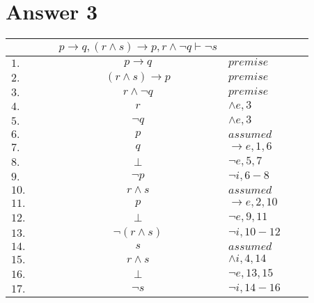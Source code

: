 \documentclass[12pt]{article}
\begin{document}
\section*{Answer 3}
\begin{table}[H]
    \centering
    \begin{tabular}{lllclrr}
        & & & $p \rightarrow q, (r \wedge s) \rightarrow p, r \wedge \neg q \vdash \neg s$ & & & \\
        \hline
        \hline
        $1.$ & & & $p \rightarrow q$ & $premise$ & & \\
        $2.$ & & & $(r \wedge s) \rightarrow p$ & $premise$ & & \\
        $3.$ & & & $r \wedge \neg q$ & $premise$ & & \\
        $4.$ & & & $r$ & $\wedge e, 3$ & & \\
        $5.$ & & & $\neg q$ & $\wedge e, 3$ & & \\
        \cline{2-7}
        $6.$ & \multicolumn{1}{|c}{} & & $p$ & $assumed$ & & \multicolumn{1}{c|}{} \\
        $7.$ & \multicolumn{1}{|c}{} & & $q$ & $\rightarrow e, 1,6$ & & \multicolumn{1}{c|}{} \\
        $8.$ & \multicolumn{1}{|c}{} & & $\bot$ & $\neg e, 5,7$ & & \multicolumn{1}{c|}{} \\
        \cline{2-7}
        $9.$ & & & $\neg p$ & $\neg i, 6-8$ & & \\
        \cline{2-7}
        $10.$ & \multicolumn{1}{|c}{} & & $r \wedge s$ & $assumed$ & & \multicolumn{1}{c|}{} \\
        $11.$ & \multicolumn{1}{|c}{} & & $p$ & $\rightarrow e, 2,10$ & & \multicolumn{1}{c|}{} \\
        $12.$ & \multicolumn{1}{|c}{} & & $\bot$ & $\neg e, 9,11$ & & \multicolumn{1}{c|}{} \\
        \cline{2-7}
        $13.$ & & & $\neg (r \wedge s)$ & $\neg i, 10-12$ & & \\
        \cline{2-7}
        $14.$ & \multicolumn{1}{|c}{} & & $s$ & $assumed$ & & \multicolumn{1}{c|}{} \\
        $15.$ & \multicolumn{1}{|c}{} & & $r \wedge s$ & $\wedge i, 4,14$ & & \multicolumn{1}{c|}{} \\
        $16.$ & \multicolumn{1}{|c}{} & & $\bot$ & $\neg e, 13,15$ & & \multicolumn{1}{c|}{} \\
        \cline{2-7}
        $17.$ & & & $\neg s$ & $\neg i, 14-16$ & & \\
    \end{tabular}
\end{table}
\end{document}
